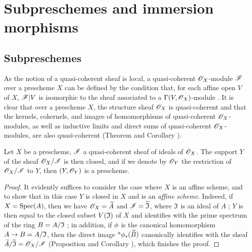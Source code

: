\section{Subpreschemes and immersion morphisms}
\label{section-subpreschemes-and-immersion-morphisms}

\subsection{Subpreschemes}
\label{subsection-subpreschemes}

\begin{env}[4.1.1]
\label{1.4.1.1}
As the notion of a quasi-coherent sheaf  is local,
a quasi-coherent $\mathscr{O}_X$-module $\mathscr{F}$ over a prescheme $X$ can be defined by the condition
that, for each affine open $V$ of $X$, $\mathscr{F}|V$ is isomorphic to the sheaf associated to a
$\Gamma(V,\mathscr{O}_X)$-module . It is clear that over a prescheme
$X$, the structure sheaf $\mathscr{O}_X$ is quasi-coherent and that the kernels, cokernels, and
images of homomorphisms of quasi-coherent $\mathscr{O}_X$-modules, as well as inductive limits and
direct sums of quasi-coherent $\mathscr{O}_X$-modules, are also quasi-coherent
(Theorem  and Corollary ).
\end{env}

\begin{prop}[4.1.2]
\label{1.4.1.2}
Let $X$ be a prescheme, $\mathscr{I}$ a quasi-coherent sheaf of ideals of $\mathscr{O}_X$. The support
$Y$ of the sheaf $\mathscr{O}_X/\mathscr{I}$ is then closed, and if we denote by $\mathscr{O}_Y$ the restriction
of $\mathscr{O}_X/\mathscr{I}$ to $Y$, then $(Y,\mathscr{O}_Y)$ is a prescheme.
\end{prop}

\begin{proof}
\label{proof-1.4.1.2}
It evidently suffices  to consider the case where $X$ is an
affine scheme, and to show that in this case $Y$ is closed in $X$ and is an {\em affine
scheme}. Indeeed, if $X={\mathop{\mathrm{Spec}}\nolimits}(A)$, then we have $\mathscr{O}_X=\widetilde{A}$ and
$\mathscr{I}=\widetilde{\mathfrak{I}}$, where $\mathfrak{I}$ is an ideal of $A$
; $Y$ is then equal to the closed subset $V(\mathfrak{I})$ of
$X$ and identifies with the prime spectrum of the ring $B=A/\mathfrak{I}$
; in addition, if $\phi$ is the canonical
homomorphism $A\to B=A/\mathfrak{I}$, then the direct image ${}^a\phi_*(\widetilde{B})$
canonically identifies with the sheaf $\widetilde{A}/\widetilde{\mathfrak{I}}=\mathscr{O}_X/\mathscr{I}$
(Proposition  and Corollary ),
which finishes the proof.
\end{proof}

